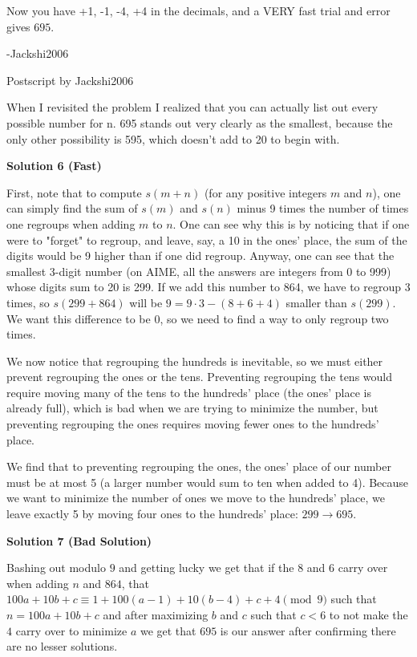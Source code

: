 \begin{enumerate}
 
Now you have +1, -1, -4, +4 in the decimals, and a VERY fast trial and error gives $\boxed{695}.$

 
-Jackshi2006

 Postscript by Jackshi2006

 When I revisited the problem I realized that you can actually list out every possible number for n. 695 stands out very clearly as the smallest, because the only other possibility is 595, which doesn’t add to 20 to begin with.

 



\textbf{Solution 6 (Fast)}

First, note that to compute $s(m+n)$ (for any positive integers $m$ and $n$), one can simply find the sum of $s(m)$ and $s(n)$ minus 9 times the number of times one regroups when adding $m$ to $n$.  One can see why this is by noticing that if one were to "forget" to regroup, and leave, say, a 10 in  the ones' place, the sum of the digits would be 9 higher than if one did regroup.  Anyway, one can see that the smallest 3-digit number (on AIME, all the answers are integers from 0 to 999) whose digits sum to 20 is 299.  If we add this number to 864, we have to regroup 3 times, so $s(299+864)$ will be $9=9\cdot3-(8+6+4)$ smaller than $s(299)$.  We want this difference to be 0, so we need to find a way to only regroup two times.

 
We now notice that regrouping the hundreds is inevitable, so we must either prevent regrouping the ones or the tens.  Preventing regrouping the tens would require moving many of the tens to the hundreds' place (the ones' place is already full), which is bad when we are trying to minimize the number, but preventing regrouping the ones requires moving fewer ones to the hundreds' place.

 
We find that to preventing regrouping the ones, the ones' place of our number must be at most 5 (a larger number would sum to ten when added to 4).  Because we want to minimize the number of ones we move to the hundreds' place, we leave exactly 5 by moving four ones to the hundreds' place:  $299\to\boxed{695}$.

 



\textbf{Solution 7 (Bad Solution)}

Bashing out modulo $9$ and getting lucky we get that if the $8$ and $6$ carry over when adding $n$ and $864$, that $100a+10b+c \equiv 1+100(a-1)+10(b-4)+c+4 \pmod{9}$ such that $n=100a+10b+c$ and after maximizing $b$ and $c$ such that $c<6$ to not make the $4$ carry over to minimize $a$ we get that $\boxed{695}$ is our answer after confirming there are no lesser solutions.


\end{enumerate}
